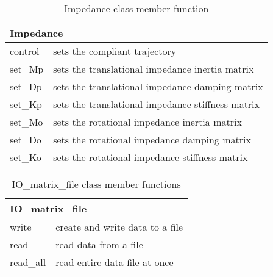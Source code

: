 \documentclass[11pt,fleqn,letterpaper]{report}
\begin{document}
\begin{table}[htbp]
\caption{Impedance class member function}
\label{tab:commandsum1h}
\begin{center}
\begin{tabular}{||l|l||}
\hline
\hline
\multicolumn{2}{||l||}{{\bf Impedance}} \\
\hline
\hline
control & sets the compliant trajectory \\
\hline
set\_Mp & sets the translational impedance inertia matrix \\
\hline
set\_Dp & sets the translational impedance damping matrix \\
\hline
set\_Kp & sets the translational impedance stiffness matrix \\
\hline
set\_Mo & sets the rotational impedance inertia matrix \\
\hline
set\_Do & sets the rotational impedance damping matrix \\
\hline
set\_Ko & sets the rotational impedance stiffness matrix \\
\hline
\end{tabular}
\end{center}
\end{table}

\begin{table}[htbp]
\caption{IO\_matrix\_file class member functions}
\label{tab:commandsum1i}
\begin{center}
\begin{tabular}{||l|l||}
\hline
\hline
\multicolumn{2}{||l||}{{\bf IO\_matrix\_file}} \\
\hline
\hline
write & create and write data to a file \\
\hline
read & read data from a file  \\
\hline
read\_all & read entire data file at once \\
\hline
\end{tabular}
\end{center}
\end{table}
\end{document}
